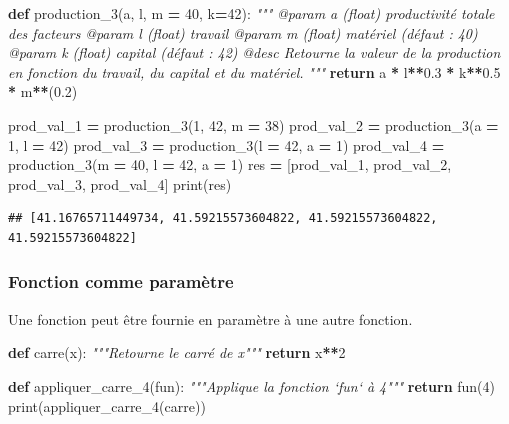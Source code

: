\documentclass[12pt,]{book}
\newenvironment{Shaded}{\begin{snugshade}}{\end{snugshade}}
\newcommand{\KeywordTok}[1]{\textcolor[rgb]{0.13,0.29,0.53}{\textbf{#1}}}
\newcommand{\DecValTok}[1]{\textcolor[rgb]{0.00,0.00,0.81}{#1}}
\newcommand{\FloatTok}[1]{\textcolor[rgb]{0.00,0.00,0.81}{#1}}
\newcommand{\CommentTok}[1]{\textcolor[rgb]{0.56,0.35,0.01}{\textit{#1}}}
\newcommand{\ControlFlowTok}[1]{\textcolor[rgb]{0.13,0.29,0.53}{\textbf{#1}}}
\newcommand{\OperatorTok}[1]{\textcolor[rgb]{0.81,0.36,0.00}{\textbf{#1}}}
\newcommand{\BuiltInTok}[1]{#1}
\newcommand{\NormalTok}[1]{#1}
\numberwithin{equation}{section}
\numberwithin{countremarque}{section}
\begin{document}
\begin{Shaded}
\begin{Highlighting}[]
\KeywordTok{def}\NormalTok{ production_3(a, l, m }\OperatorTok{=} \DecValTok{40}\NormalTok{, k}\OperatorTok{=}\DecValTok{42}\NormalTok{):}
  \CommentTok{"""}
\CommentTok{  @param a (float) productivité totale des facteurs}
\CommentTok{  @param l (float) travail}
\CommentTok{  @param m (float) matériel (défaut : 40)}
\CommentTok{  @param k (float) capital (défaut : 42)}
\CommentTok{  @desc Retourne la valeur de la production en fonction}
\CommentTok{    du travail, du capital et du matériel.}
\CommentTok{  """}
  \ControlFlowTok{return}\NormalTok{ a }\OperatorTok{*}\NormalTok{ l}\OperatorTok{**}\FloatTok{0.3} \OperatorTok{*}\NormalTok{ k}\OperatorTok{**}\FloatTok{0.5} \OperatorTok{*}\NormalTok{ m}\OperatorTok{**}\NormalTok{(}\FloatTok{0.2}\NormalTok{)}
  
\NormalTok{prod_val_1 }\OperatorTok{=}\NormalTok{ production_3(}\DecValTok{1}\NormalTok{, }\DecValTok{42}\NormalTok{, m }\OperatorTok{=} \DecValTok{38}\NormalTok{)}
\NormalTok{prod_val_2 }\OperatorTok{=}\NormalTok{ production_3(a }\OperatorTok{=} \DecValTok{1}\NormalTok{, l }\OperatorTok{=} \DecValTok{42}\NormalTok{)}
\NormalTok{prod_val_3 }\OperatorTok{=}\NormalTok{ production_3(l }\OperatorTok{=} \DecValTok{42}\NormalTok{, a }\OperatorTok{=} \DecValTok{1}\NormalTok{)}
\NormalTok{prod_val_4 }\OperatorTok{=}\NormalTok{ production_3(m }\OperatorTok{=} \DecValTok{40}\NormalTok{, l }\OperatorTok{=} \DecValTok{42}\NormalTok{, a }\OperatorTok{=} \DecValTok{1}\NormalTok{)}
\NormalTok{res }\OperatorTok{=}\NormalTok{ [prod_val_1, prod_val_2, prod_val_3, prod_val_4]}
\BuiltInTok{print}\NormalTok{(res)}
\end{Highlighting}
\end{Shaded}

\begin{lstlisting}
## [41.16765711449734, 41.59215573604822, 41.59215573604822, 41.59215573604822]
\end{lstlisting}

\subsubsection{Fonction comme paramètre}\label{fonction-comme-parametre}

Une fonction peut être fournie en paramètre à une autre fonction.

\begin{Shaded}
\begin{Highlighting}[]
\KeywordTok{def}\NormalTok{ carre(x):}
  \CommentTok{"""Retourne le carré de x"""}
  \ControlFlowTok{return}\NormalTok{ x}\OperatorTok{**}\DecValTok{2}
  
\KeywordTok{def}\NormalTok{ appliquer_carre_4(fun):}
  \CommentTok{"""Applique la fonction `fun` à 4"""}
  \ControlFlowTok{return}\NormalTok{ fun(}\DecValTok{4}\NormalTok{)}
\BuiltInTok{print}\NormalTok{(appliquer_carre_4(carre))}
\end{Highlighting}
\end{Shaded}
\end{document}
